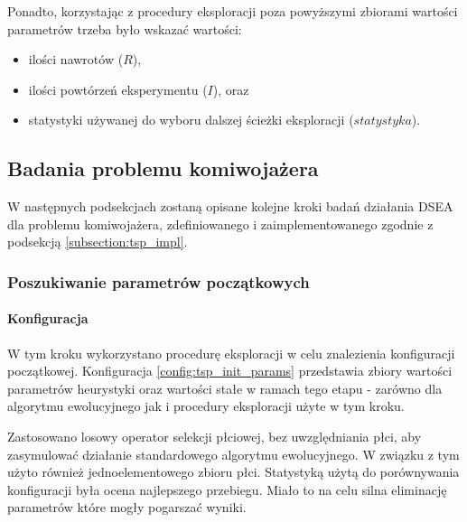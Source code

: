 \documentclass[./FM_mgr.tex]{subfiles}
\begin{document}
Ponadto, korzystając z procedury eksploracji poza powyższymi zbiorami wartości parametrów trzeba było wskazać wartości:

\begin{itemize}
	\item ilości nawrotów ($R$),
	\item ilości powtórzeń eksperymentu ($I$), oraz
	\item statystyki używanej do wyboru dalszej ścieżki eksploracji ($statystyka$).
\end{itemize}

\subsection{Badania problemu komiwojażera}

W następnych podsekcjach zostaną opisane kolejne kroki badań działania DSEA dla problemu komiwojażera, zdefiniowanego i zaimplementowanego zgodnie z podsekcją \ref{subsection:tsp_impl}.

\subsubsection{Poszukiwanie parametrów początkowych}

\paragraph{Konfiguracja}

W tym kroku wykorzystano procedurę eksploracji w celu znalezienia konfiguracji początkowej. 
Konfiguracja \ref{config:tsp_init_params} przedstawia zbiory wartości parametrów heurystyki oraz wartości stałe w ramach tego etapu - zarówno dla algorytmu ewolucyjnego jak i procedury eksploracji użyte w tym kroku.

Zastosowano losowy operator selekcji płciowej, bez uwzględniania płci, aby zasymulować działanie standardowego algorytmu ewolucyjnego. 
W związku z tym użyto również jednoelementowego zbioru płci. 
Statystyką użytą do porównywania konfiguracji była ocena najlepszego przebiegu.
Miało to na celu silna eliminację parametrów które mogły pogarszać wyniki.
\end{document}
